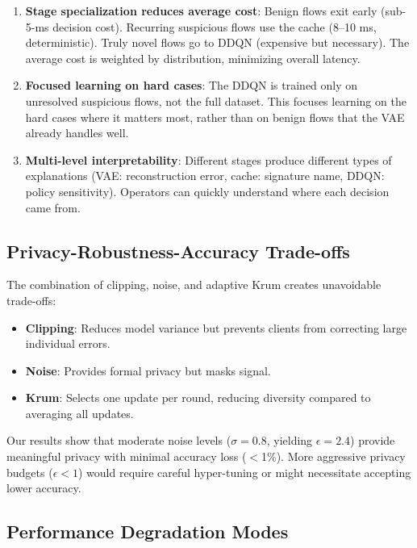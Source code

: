 \documentclass[preprint,12pt]{elsarticle}
\begin{document}
\begin{enumerate}[label=(\roman*),leftmargin=1.2em]
    \item \textbf{Stage specialization reduces average cost}: Benign flows exit early (sub-5-ms decision cost). Recurring suspicious flows use the cache (8--10 ms, deterministic). Truly novel flows go to DDQN (expensive but necessary). The average cost is weighted by distribution, minimizing overall latency.
    
    \item \textbf{Focused learning on hard cases}: The DDQN is trained only on unresolved suspicious flows, not the full dataset. This focuses learning on the hard cases where it matters most, rather than on benign flows that the VAE already handles well.
    
    \item \textbf{Multi-level interpretability}: Different stages produce different types of explanations (VAE: reconstruction error, cache: signature name, DDQN: policy sensitivity). Operators can quickly understand where each decision came from.
\end{enumerate}

\subsection{Privacy-Robustness-Accuracy Trade-offs}

The combination of clipping, noise, and adaptive Krum creates unavoidable trade-offs:

\begin{itemize}[leftmargin=1.2em]
    \item \textbf{Clipping}: Reduces model variance but prevents clients from correcting large individual errors.
    \item \textbf{Noise}: Provides formal privacy but masks signal.
    \item \textbf{Krum}: Selects one update per round, reducing diversity compared to averaging all updates.
\end{itemize}

Our results show that moderate noise levels ($\sigma = 0.8$, yielding $\epsilon = 2.4$) provide meaningful privacy with minimal accuracy loss ($<$1\%). More aggressive privacy budgets ($\epsilon < 1$) would require careful hyper-tuning or might necessitate accepting lower accuracy.

\subsection{Performance Degradation Modes}
\end{document}
